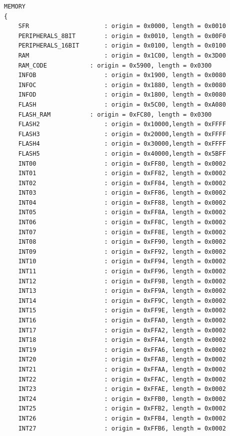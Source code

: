 \documentclass[LaM,binding=0.6cm,oneside]{../sapthesis}
\begin{document}
\begin{lstlisting}
MEMORY
{
    SFR                     : origin = 0x0000, length = 0x0010
    PERIPHERALS_8BIT        : origin = 0x0010, length = 0x00F0
    PERIPHERALS_16BIT       : origin = 0x0100, length = 0x0100
    RAM                     : origin = 0x1C00, length = 0x3D00	
    RAM_CODE		    : origin = 0x5900, length = 0x0300
    INFOB                   : origin = 0x1900, length = 0x0080
    INFOC                   : origin = 0x1880, length = 0x0080
    INFOD                   : origin = 0x1800, length = 0x0080
    FLASH                   : origin = 0x5C00, length = 0xA080	
    FLASH_RAM		    : origin = 0xFC80, length = 0x0300
    FLASH2                  : origin = 0x10000,length = 0xFFFF
    FLASH3                  : origin = 0x20000,length = 0xFFFF
    FLASH4                  : origin = 0x30000,length = 0xFFFF
    FLASH5                  : origin = 0x40000,length = 0x5BFF
    INT00                   : origin = 0xFF80, length = 0x0002
    INT01                   : origin = 0xFF82, length = 0x0002
    INT02                   : origin = 0xFF84, length = 0x0002
    INT03                   : origin = 0xFF86, length = 0x0002
    INT04                   : origin = 0xFF88, length = 0x0002
    INT05                   : origin = 0xFF8A, length = 0x0002
    INT06                   : origin = 0xFF8C, length = 0x0002
    INT07                   : origin = 0xFF8E, length = 0x0002
    INT08                   : origin = 0xFF90, length = 0x0002
    INT09                   : origin = 0xFF92, length = 0x0002
    INT10                   : origin = 0xFF94, length = 0x0002
    INT11                   : origin = 0xFF96, length = 0x0002
    INT12                   : origin = 0xFF98, length = 0x0002
    INT13                   : origin = 0xFF9A, length = 0x0002
    INT14                   : origin = 0xFF9C, length = 0x0002
    INT15                   : origin = 0xFF9E, length = 0x0002
    INT16                   : origin = 0xFFA0, length = 0x0002
    INT17                   : origin = 0xFFA2, length = 0x0002
    INT18                   : origin = 0xFFA4, length = 0x0002
    INT19                   : origin = 0xFFA6, length = 0x0002
    INT20                   : origin = 0xFFA8, length = 0x0002
    INT21                   : origin = 0xFFAA, length = 0x0002
    INT22                   : origin = 0xFFAC, length = 0x0002
    INT23                   : origin = 0xFFAE, length = 0x0002
    INT24                   : origin = 0xFFB0, length = 0x0002
    INT25                   : origin = 0xFFB2, length = 0x0002
    INT26                   : origin = 0xFFB4, length = 0x0002
    INT27                   : origin = 0xFFB6, length = 0x0002

\end{lstlisting}
\end{document}
